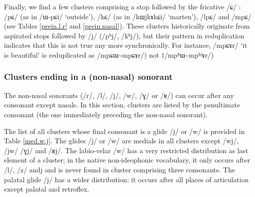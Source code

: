 \documentclass[oneside,a4paper,11pt]{article}
\newcommand{\ipa}[1]{\mbox{\phon/#1/}}
\newcommand{\tld}{\textasciitilde{}}
\newcommand{\resetcounters}[2]{
\newcounter{#1}
\newcounter{#2}
 \setcounter{#1}{\value{2clusters}}
  \setcounter{#2}{\value{3clusters}}
 \setcounter{2clusters}{0}
  \setcounter{3clusters}{0}
}
\begin{document}
 \resetcounters{2nC}{3nC} %
Finally, we find a few clusters comprising a stop followed by the fricative \ipa{ɕ} :  \ipa{pɕ}  (as in \ipa{ɯ-pɕi}  `outside'),  \ipa{kɕ}  (as in \ipa{kɯjkɤkɕi}  `marten'), \ipa{lpɕ} and \ipa{mpɕ} (see Tables \ref{prein.l.r} and  \ref{prein.nasal}). These clusters historically originate from aspirated stops followed by \ipa{j} (\ipa{pʰj}, \ipa{kʰj}), but their pattern in reduplication indicates that this is not true any more synchronically. For instance, \ipa{mpɕɤr} `it is beautiful' is reduplicated as \ipa{mpɕɯ\tld{}mpɕɤr}) not $\dagger$\ipa{mpʰɯ\tld{}mpʰʲɤr}) 

 \subsubsection*{Clusters ending in a (non-nasal) sonorant}   \label{sec:medial}
  The non-nasal sonorants (\ipa{r}, \ipa{l}, \ipa{j}, \ipa{w}, \ipa{ɣ} or \ipa{ʁ}) can occur after any consonant except nasals. In this section, clusters are listed by the penultimate consonant  (the one immediately preceding the non-nasal sonorant).  
  
 The list of all clusters whose final consonant is a glide  \ipa{j} or \ipa{w} is provided in Table \ref{med.w.j}. The glides  \ipa{j} or \ipa{w} are medials in all clusters except \ipa{wj}, \ipa{jw} \ipa{ɣj} and \ipa{ʁj}. The labio-velar \ipa{w} has a very restricted distribution as last element of a cluster; in the native non-ideophonic vocabulary, it only occurs after \ipa{l}, \ipa{z} and{j} and is never found in cluster comprising three consonants. The palatal glide \ipa{j} has a wider distribution: it occurs after all places of articulation except palatal and retroflex.
  
  
  
\end{document}
